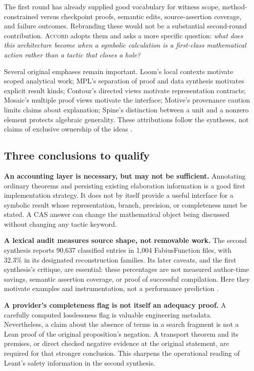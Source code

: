 \documentclass[11pt,a4paper]{article}
\newcommand{\Accord}{\textsc{Accord}}
\theoremstyle{definition}
\begin{document}
The first round has already supplied good vocabulary for witness scope,
method-constrained versus checkpoint proofs, semantic edits, source-assertion
coverage, and failure outcomes. Rebranding these would not be a substantial
second-round contribution. \Accord{} adopts them and asks a more specific
question: \emph{what does this architecture become when a symbolic calculation
is a first-class mathematical action rather than a tactic that closes a hole?}

Several original emphases remain important. Loom's local contexts motivate
scoped analytical work; MPL's separation of proof and data synthesis motivates
explicit result kinds; Contour's directed views motivate representation contracts;
Mosaic's multiple proof views motivate the interface; Motive's provenance caution
limits claims about explanation; Spine's distinction between a unit and a
nonzero element protects algebraic generality. These attributions follow the
syntheses, not claims of exclusive ownership of the ideas \cite{syn-a,syn-b}.

\subsection{Three conclusions to qualify}
\textbf{An accounting layer is necessary, but may not be sufficient.}
Annotating ordinary theorems and persisting existing elaboration information is
a good first implementation strategy. It does not by itself provide a useful
interface for a symbolic result whose representation, branch, precision, or
completeness must be stated. A CAS answer can change the mathematical object
being discussed without changing any tactic keyword.

\textbf{A lexical audit measures source shape, not removable work.}
The second synthesis reports 90,637 classified entries in 1,004 FabiusFunction
files, with 32.3\% in its designated reconstruction families. Its later caveats,
and the first synthesis's critique, are essential: these percentages are not
measured author-time savings, semantic assertion coverage, or proof of successful
compilation. Here they motivate examples and instrumentation, not a performance
prediction \cite{syn-a,syn-b}.

\textbf{A provider's completeness flag is not itself an adequacy proof.}
A carefully computed losslessness flag is valuable engineering metadata.
Nevertheless, a claim about the absence of terms in a search fragment is not
a Lean proof of the original proposition's negation. A transport theorem and
its premises, or direct checked negative evidence at the original statement,
are required for that stronger conclusion. This sharpens the operational reading
of Leant's safety information in the second synthesis.
\end{document}
